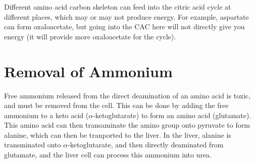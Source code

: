 Different amino acid carbon skeleton can feed into the citric acid cycle at different places, which may or may not produce energy.
For example, aspartate can form oxaloacetate, but going into the CAC here will not directly give you energy (it will provide more oxaloacetate for the cycle).

\section{Removal of Ammonium}

Free ammonium released from the direct deamination of an amino acid is toxic, and must be removed from the cell.
This can be done by adding the free ammonium to a keto acid ($\alpha$-ketoglutarate) to form an amino acid (glutamate).
This amino acid can then transaminate the amino group onto pyruvate to form alanine, which can then be tranported to the liver.
In the liver, alanine is transminated onto $\alpha$-ketoglutarate, and then directly deaminated from glutamate, and the liver cell can process this ammonium into urea.

\begin{center}
\end{center}

